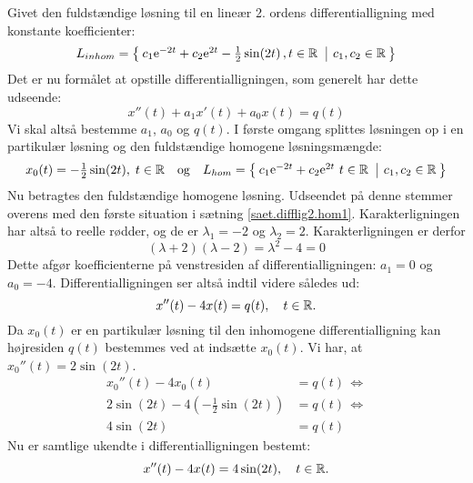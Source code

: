 \begin{example}
Givet den fuldstændige løsning til en lineær 2. ordens differentialligning med konstante koefficienter:
\begin{equation}
L_{inhom} = \left\lbrace \hspace*{-1mm} \begin{array}{c|c} c_1 \mathrm{e}^{-2t} + c_2 \mathrm{e}^{2t} - \tfrac{1}{2}\sin(2t)\,,t \in \mathbb{R}\, &  c_1,c_2 \in \mathbb{R} \end{array} \hspace*{-1mm} \right\rbrace
\end{equation}
Det er nu formålet at opstille differentialligningen, som generelt har dette udseende:
\begin{equation}
x''(t) + a_1x'(t) + a_0x(t) = q(t)
\end{equation}
Vi skal altså bestemme $ a_1 $, $ a_0 $ og $ q(t) $. \bs
I første omgang splittes løsningen op i en partikulær løsning og den fuldstændige homogene løsningsmængde:
\begin{equation}
x_0(t) =  - \tfrac{1}{2}\sin(2t),\; t \in \mathbb{R} \quad \mathrm{og} \quad L_{hom} = \left\lbrace \hspace*{-1mm} \begin{array}{c|c} c_1 \mathrm{e}^{-2t} + c_2 \mathrm{e}^{2t}\,\,t \in \mathbb{R}\, & c_1,c_2 \in \mathbb{R} \end{array} \hspace*{-1mm} \right\rbrace
\end{equation}
Nu betragtes den fuldstændige homogene løsning. Udseendet på denne stemmer overens med den første situation i sætning \ref{saet.difflig2.hom1}. Karakterligningen har altså to reelle rødder, og de er $ \lambda_1 = -2 $ og $ \lambda_2 = 2 $. Karakterligningen er derfor
\begin{equation}
(\lambda + 2)(\lambda - 2) = \lambda^2 - 4 = 0
\end{equation}
Dette afgør koefficienterne på venstresiden af differentialligningen: $ a_1 = 0 $ og $ a_0 = -4 $. Differentialligningen ser altså indtil videre således ud:
\begin{equation}
x''(t) -4x(t) = q(t), \quad t \in \mathbb{R}.
\end{equation}
Da $ x_0(t) $ er en partikulær løsning til den inhomogene differentialligning kan højresiden $ q(t) $ bestemmes ved at indsætte $ x_0(t) $. Vi har, at $ x_0''(t) = 2\sin(2t) $.
\begin{equation}
\begin{aligned}
x_0''(t) -4x_0(t) &= q(t) \, \Leftrightarrow \\
2\sin(2t) -4(- \tfrac{1}{2}\sin(2t)) &= q(t) \, \Leftrightarrow \\
4\sin(2t) &= q(t)
\end{aligned}
\end{equation}
Nu er samtlige ukendte i differentialligningen bestemt:
\begin{equation}
x''(t) - 4 x(t) = 4\sin(2t), \quad t \in \mathbb{R}.
\end{equation}
\end{example}

